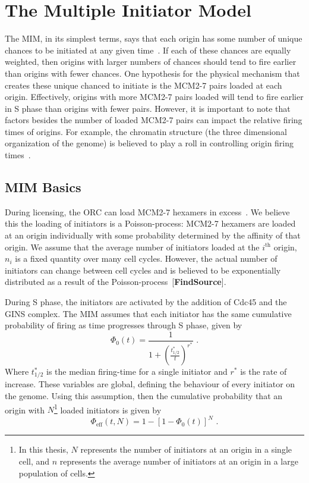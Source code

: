 	
	\section{The Multiple Initiator Model}
	\label{sec:MIM}
	
	The MIM, in its simplest terms, says that each origin has some number of unique chances to be initiated at any given time~\cite{ScottsThesis}.
	If each of these chances are equally weighted, then origins with larger numbers of chances should tend to fire earlier than origins with fewer chances.
	One hypothesis for the physical mechanism that creates these unique chanced to initiate is the MCM2-7 pairs loaded at each origin.
	Effectively, origins with more MCM2-7 pairs loaded will tend to fire earlier in S phase than origins with fewer pairs.
	However, it is important to note that factors besides the number of loaded MCM2-7 pairs can impact the relative firing times of origins.
	For example, the chromatin structure (the three dimensional organization of the genome) is believed to play a roll in controlling origin firing times~\cite{Chromatin}.
	
		\subsection{MIM Basics}
		\label{subsec:MIMBasics}
		During licensing, the ORC can load MCM2-7 hexamers in excess~\cite{MultiMCM}.
		We believe this the loading of initiators is a Poisson-process:
		MCM2-7 hexamers are loaded at an origin individually with some probability determined by the affinity of that origin.
		We assume that the average number of initiators loaded at the $i^{\text{th}}$ origin, $n_i$ is a fixed quantity over many cell cycles.
		However, the actual number of initiators can change between cell cycles and is believed to be exponentially distributed as a result of the Poisson-process~[\textbf{FindSource}].
		
		During S phase, the initiators are activated by the addition of Cdc45 and the GINS complex.
		The MIM assumes that each initiator has the same cumulative probability of firing as time progresses through S phase, given by
		\begin{equation}\label{eq:CPDInitiator}
			\Phi_0(t) = \frac{1}{1+\left(\frac{t^*_{1/2}}{t}\right)^{r^*}}\text{ .}
		\end{equation}
		Where $t^*_{1/2}$ is the median firing-time for a single initiator and $r^*$ is the rate of increase.
		These variables are global, defining the behaviour of every initiator on the genome.
		Using this assumption, then the cumulative probability that an origin with $N$\footnote{In this thesis, $N$ represents the number of initiators at an origin in a single cell, and $n$ represents the average number of initiators at an origin in a large population of cells.} loaded initiators is given by
		\begin{equation} \label{eq:CPDEffectiveN}
			\Phi_{\text{eff}}(t,N) = 1 - \left[1 - \Phi_0(t)\right]^N\text{ .}
		\end{equation}
	
